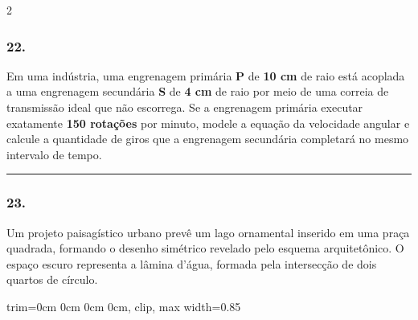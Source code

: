 \documentclass[twoside, 10pt, a4paper]{article}
\newlength{\espacoPreQuestao}\setlength{\espacoPreQuestao}{0.1cm}
\newlength{\espacoQuestao}\setlength{\espacoQuestao}{0.2cm}
\newcommand{\larguraTikz}{0.85\linewidth}
\begin{document}
\begin{multicols*}{2}
\subsubsection*{22.} Em uma indústria, uma engrenagem primária \textbf{P} de \textbf{10 cm} de raio está acoplada a uma engrenagem secundária \textbf{S} de \textbf{4 cm} de raio por meio de uma correia de transmissão ideal que não escorrega. Se a engrenagem primária executar exatamente \textbf{150 rotações} por minuto, modele a equação da velocidade angular e calcule a quantidade de giros que a engrenagem secundária completará no mesmo intervalo de tempo.
\par\vspace{\espacoQuestao}

\noindent\textcolor{CorLinha}{\rule{\linewidth}{0.5pt}} 
\par\vspace{\espacoPreQuestao}
\subsubsection*{23.} Um projeto paisagístico urbano prevê um lago ornamental inserido em uma praça quadrada, formando o desenho simétrico revelado pelo esquema arquitetônico. O espaço escuro representa a lâmina d'água, formada pela intersecção de dois quartos de círculo.
\begin{center}
\begin{adjustbox}{trim=0cm 0cm 0cm 0cm, clip, max width=\larguraTikz}
\end{adjustbox}
\end{center}
\end{multicols*}
\end{document}
